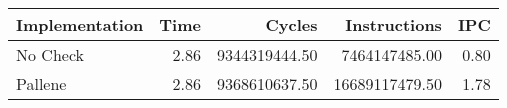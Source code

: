 \begin{tabular}{lrrrr}
  \toprule
Implementation & Time & Cycles & Instructions & IPC \\ 
  \midrule
No Check & 2.86 & 9344319444.50 & 7464147485.00 & 0.80 \\ 
  Pallene & 2.86 & 9368610637.50 & 16689117479.50 & 1.78 \\ 
   \bottomrule
\end{tabular}
